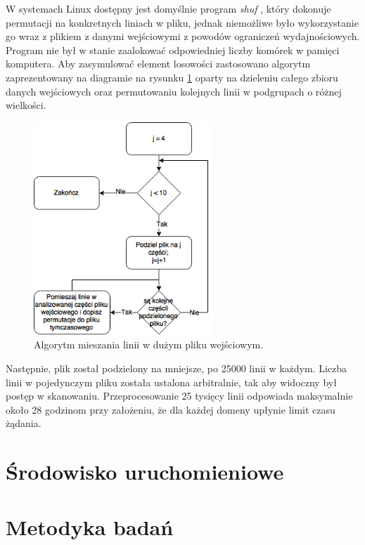 W systemach Linux dostępny jest domyślnie program \textit{shuf} \cite{shuf}, który dokonuje permutacji na konkretnych liniach w pliku,
jednak niemożliwe było wykorzystanie go wraz z plikiem z danymi wejściowymi z powodów ograniczeń wydajnościowych. Program nie był w
stanie zaalokować odpowiedniej liczby komórek w pamięci komputera. Aby zasymulować element losowości zastosowano algorytm zaprezentowany
na diagramie na rysunku \ref{fig:shufAlgorithm} oparty na dzieleniu całego zbioru danych wejściowych oraz permutowaniu kolejnych linii
w podgrupach o różnej wielkości.

\begin{figure}[ht]
	\centering
	\includegraphics[width=0.6\textwidth]{image/sfuh}
	\caption{Algorytm mieszania linii w dużym pliku wejściowym.}
	\label{fig:shufAlgorithm}
\end{figure}

Następnie, plik został podzielony na mniejsze, po 25000 linii w każdym. Liczba linii w pojedynczym pliku została ustalona arbitralnie,
tak aby widoczny był postęp w skanowaniu. Przeprocesowanie 25 tysięcy linii odpowiada maksymalnie około 28 godzinom przy założeniu,
że dla każdej domeny upłynie limit czasu żądania.

\section{Środowisko uruchomieniowe}


\section{Metodyka badań}


